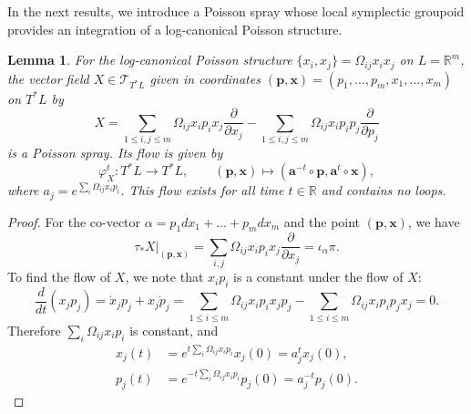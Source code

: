 \documentclass{amsart}
\newtheorem{lemma}[theorem]{Lemma}
\numberwithin{equation}{section}
\newcommand{\bfa}{{\boldsymbol{a}}}
\newcommand{\bfp}{{\boldsymbol{p}}}
\newcommand{\bfx}{{\boldsymbol{x}}}
\newcommand{\cT}{\mathcal{T}}
\newcommand{\RR}{\mathbb{R}}
\begin{document}
In the next results, we introduce a Poisson spray whose local symplectic groupoid provides an integration of a log-canonical Poisson structure.
\begin{lemma} \label{lemma:PoisSp}
  For the log-canonical Poisson structure $\{x_i, x_j\} = \Omega_{ij} x_i x_j$ on $L = \RR^m$, the vector field $X \in \cT_{T^*L}$ given in coordinates $(\bfp, \bfx) = (p_1, \ldots, p_m, x_1, \ldots, x_m)$ on $T^*L$ by
  \begin{equation} 
    \label{eq: PoisSp}
    X = \sum_{1 \leq i,j \leq m}\Omega_{ij}x_i p_i x_j\frac{\partial}{\partial x_j} - \sum_{1 \leq i,j \leq m}\Omega_{ij}x_ip_i p_j\frac{\partial}{\partial p_j}
  \end{equation}
  is a Poisson spray.
  Its flow is given by
  \[\varphi_X^t: T^*L \to T^*L, \qquad (\bfp, \bfx) \mapsto (\bfa^{-t} \circ \bfp, \bfa^t \circ \bfx),\]
  where $a_j = e^{\sum_i \Omega_{ij} x_ip_i}$.
  This flow exists for all time $t \in \RR$ and contains no loops.
\end{lemma}

\begin{proof}
  For the co-vector $\alpha = p_1 dx_1 + \ldots + p_m dx_m$ and the point $(\bfp, \bfx)$, we have
  \[\tau_* X|_{(\bfp,\bfx)} = \sum_{i, j}\Omega_{ij} x_i p_i x_j \frac{\partial}{\partial x_j} = \iota_\alpha \pi.\]
  To find the flow of $X$, we note that $x_i p_i$ is a constant under the flow of $X$:
  \[\frac{d}{dt}(x_j p_j) = \dot{x}_j p_j + x_j \dot{p}_j = \sum_{1 \leq i \leq m}\Omega_{ij}x_i p_i x_j p_j - \sum_{1 \leq i \leq m}\Omega_{ij}x_ip_i p_j x_j = 0.\]
  Therefore $\sum_{i}\Omega_{ij}x_i p_i$ is constant, and
  \begin{align*}
    x_j(t) & = e^{t \sum_i \Omega_{ij} x_ip_i} x_j(0) = a_j^t x_j(0), \\
    p_j(t) & = e^{-t \sum_i \Omega_{ij} x_ip_i} p_j(0) = a_j^{-t} p_j(0).
  \end{align*}
\end{proof}
\end{document}
